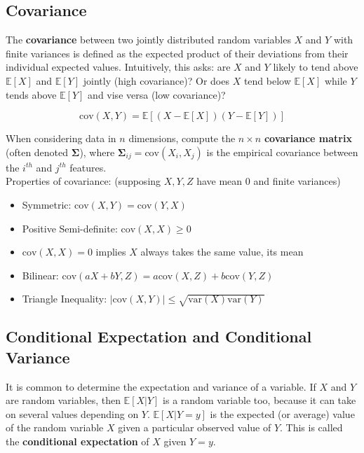 \documentclass{harvardml}
\theoremstyle{definition}
\theoremstyle{plain}
\newcommand{\E}{\mathbb{E}}
\newcommand{\var}{\text{var}}
\newcommand{\cov}{\text{cov}}
\renewcommand{\v}[1]{\mathbf{#1}}
\begin{document}
	\subsection{Covariance}

        The \textbf{covariance} between two jointly distributed random 
		variables $X$ and $Y$ with finite variances is defined as the 
		expected product of their deviations from their individual 
		expected values. Intuitively, this asks: are $X$ and $Y$ 
		likely to tend above $\E[X]$ and $\E[Y]$ jointly (high covariance)? 
		Or does $X$ tend below $\E[X]$ while $Y$ tends above $\E[Y]$ and 
		vise versa (low covariance)?
        
        $$ \cov(X,Y) = \E[(X - \E[X])(Y - \E[Y])]$$

        \noindent When considering data in $n$ dimensions, 
        compute the $n \times n$ \textbf{covariance matrix} 
        (often denoted $\v \Sigma$), where $\v \Sigma_{ij} = 
        \cov(X_i,X_j)$ is the empirical covariance between the 
        $i^{th}$ and $j^{th}$ features.\\
        

		\noindent Properties of covariance: (supposing $X,Y,Z$ have mean 0 
                  and finite variances)
		\begin{itemize}
            \item Symmetric: $\cov(X,Y) = \cov(Y,X)$
            \item Positive Semi-definite: $\cov(X,X) \geq 0$
            \item $\cov(X,X) = 0$ implies $X$ always takes the same value, 
				  its mean
            \item Bilinear: $\cov(aX + bY,Z) = a\cov(X,Z) + b\cov(Y,Z)$
            \item Triangle Inequality: $|\cov(X,Y)| \leq \sqrt{\var(X)\var(Y)}$
		\end{itemize}

	\subsection{Conditional Expectation and Conditional Variance}
		It is common to determine the expectation and variance of a variable. 
		If $X$ and $Y$ are random variables, then $\E[X|Y]$ is a random 
		variable too, because it can take on several values depending on $Y$. 
		$\E[X|Y=y]$ is the expected (or average) value of the random variable 
		$X$ given a particular observed value of $Y$. This is called the 
		\textbf{conditional expectation} of $X$ given $Y=y$.\\
	
\end{document}
